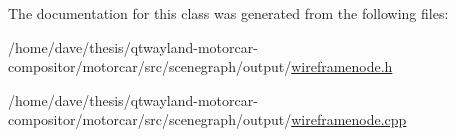 The documentation for this class was generated from the following files\-:\begin{DoxyCompactItemize}
\item 
/home/dave/thesis/qtwayland-\/motorcar-\/compositor/motorcar/src/scenegraph/output/\hyperlink{wireframenode_8h}{wireframenode.\-h}\item 
/home/dave/thesis/qtwayland-\/motorcar-\/compositor/motorcar/src/scenegraph/output/\hyperlink{wireframenode_8cpp}{wireframenode.\-cpp}\end{DoxyCompactItemize}
